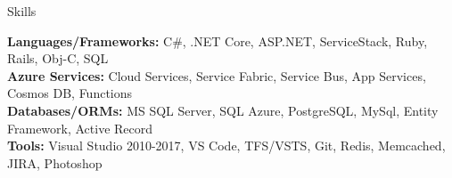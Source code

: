 \documentclass{resume} %
\begin{document}

\begin{rSection}{Skills}

\textbf{Languages/Frameworks:} C\#, .NET Core, ASP.NET, ServiceStack, Ruby, Rails, Obj-C, SQL  \\
\textbf{Azure Services:} Cloud Services, Service Fabric, Service Bus, App Services, Cosmos DB, Functions \\
\textbf{Databases/ORMs:} MS SQL Server, SQL Azure, PostgreSQL, MySql, Entity Framework, Active Record  \\
\textbf{Tools:} Visual Studio 2010-2017, VS Code, TFS/VSTS, Git, Redis, Memcached, JIRA, Photoshop  \\

\end{rSection}

\end{document}
